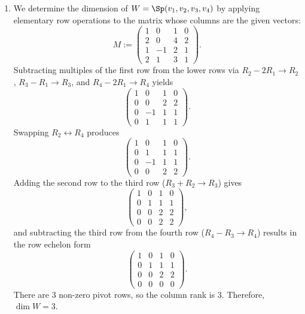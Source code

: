 \begin{exercisesolution*}
\label{sol:subspace_dimension_equations_basis_selection}
\begin{enumerate}[label=\textbf{(\alph*)}]
    \item We determine the dimension of $W = \Sp(v_1, v_2, v_3, v_4)$ by applying elementary row operations to the matrix whose columns are the given vectors:
    \[
        M := \begin{pmatrix}
            1 & 0 & 1 & 0 \\
            2 & 0 & 4 & 2 \\
            1 & -1 & 2 & 1 \\
            2 & 1 & 3 & 1
        \end{pmatrix}.
    \]
    Subtracting multiples of the first row from the lower rows via $R_2 - 2R_1 \to R_2$, $R_3 - R_1 \to R_3$, and $R_4 - 2R_1 \to R_4$ yields
    \[
        \begin{pmatrix}
            1 & 0 & 1 & 0 \\
            0 & 0 & 2 & 2 \\
            0 & -1 & 1 & 1 \\
            0 & 1 & 1 & 1
        \end{pmatrix}.
    \]
    Swapping $R_2 \leftrightarrow R_4$ produces
    \[
        \begin{pmatrix}
            1 & 0 & 1 & 0 \\
            0 & 1 & 1 & 1 \\
            0 & -1 & 1 & 1 \\
            0 & 0 & 2 & 2
        \end{pmatrix}.
    \]
    Adding the second row to the third row ($R_3 + R_2 \to R_3$) gives
    \[
        \begin{pmatrix}
            1 & 0 & 1 & 0 \\
            0 & 1 & 1 & 1 \\
            0 & 0 & 2 & 2 \\
            0 & 0 & 2 & 2
        \end{pmatrix},
    \]
    and subtracting the third row from the fourth row ($R_4 - R_3 \to R_4$) results in the row echelon form
    \[
        \begin{pmatrix}
            1 & 0 & 1 & 0 \\
            0 & 1 & 1 & 1 \\
            0 & 0 & 2 & 2 \\
            0 & 0 & 0 & 0
        \end{pmatrix}.
    \]
    There are $3$ non-zero pivot rows, so the column rank is $3$. Therefore, $\dim W = 3$.


\end{enumerate}
\end{exercisesolution*}
